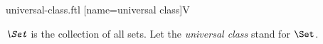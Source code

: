 \documentclass{stex}
\begin{document}
\begin{smodule}{universal-class.ftl}
[name=universal class]{\mathbb V}

\begin{definition}[forthel,for=universal class]
  $\emph{\Set}$ is the collection of all sets.
  Let the \emph{universal class} stand for $\Set$.
\end{definition}
\end{smodule}
\end{document}
